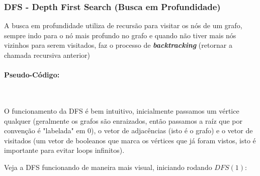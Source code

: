 \subsubsection{DFS - Depth First Search (Busca em Profundidade)}
A busca em profundidade utiliza de recursão para visitar os nós de um grafo,
sempre indo para o nó mais profundo no grafo e quando não tiver mais nós
vizinhos para serem visitados, faz o processo de \textbf{\textit{backtracking}}
(retornar a chamada recursiva anterior)

\paragraph{Pseudo-Código: }\mbox{}\\
\begin{algorithm}[H]

	\SetAlgoLined

	\caption{Busca em Profundidade (DFS)}
\end{algorithm}

O funcionamento da DFS é bem intuitivo, inicialmente passamos um vértice
qualquer (geralmente os grafos são enraizados, então passamos a raíz que por
convenção é "labelada" em 0), o vetor de adjacências (isto é o grafo) e o vetor
de visitados (um vetor de booleanos que marca os vértices que já foram vistos,
isto é importante para evitar loops infinitos).

Veja a DFS funcionando de maneira mais visual, iniciando rodando $DFS(1)$:\\

